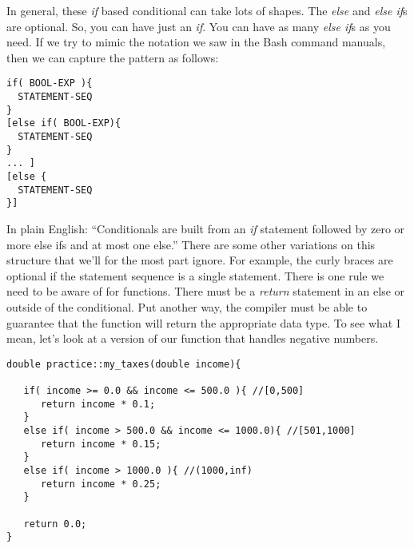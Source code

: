 \documentclass[]{tufte-handout}
\begin{document}
In general, these \textit{if} based conditional can take lots of shapes. The \textit{else} and \textit{else if}s are optional. So, you can have just an \textit{if}. You can have as many \textit{else if}s as you need. If we try to mimic the notation we saw in the Bash command manuals, then we can capture the pattern as follows:
\begin{verbatim}
if( BOOL-EXP ){
  STATEMENT-SEQ
}
[else if( BOOL-EXP){
  STATEMENT-SEQ
}
... ]
[else {
  STATEMENT-SEQ
}]
\end{verbatim}
In plain English: ``Conditionals are built from an \textit{if} statement followed by zero or more else ifs and at most one else.''  There are some other variations on this structure that we'll for the most part ignore.  For example, the curly braces are optional if the statement sequence is a single statement. There is one rule we need to be aware of for functions. There must be a \textit{return} statement in an else or outside of the conditional. Put another way, the compiler must be able to guarantee that the function will return the appropriate data type. To see what I mean, let's look at a version of our function that handles negative numbers. 

\begin{verbatim}
double practice::my_taxes(double income){

   if( income >= 0.0 && income <= 500.0 ){ //[0,500]
      return income * 0.1;
   }
   else if( income > 500.0 && income <= 1000.0){ //[501,1000]
      return income * 0.15;   
   }
   else if( income > 1000.0 ){ //(1000,inf) 
      return income * 0.25;   
   }
   
   return 0.0;
}
\end{verbatim}
\end{document}
